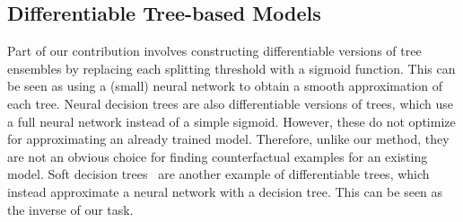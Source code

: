 \subsection{Differentiable Tree-based Models}
\label{section:focus-diff-trees}
Part of our contribution involves constructing differentiable versions of tree ensembles by replacing each splitting threshold with a sigmoid function. 
This can be seen as using a (small) neural network to obtain a smooth approximation of each tree. 
Neural decision trees \citep{balestriero_neural_2017, yang_deep_2018} are also differentiable versions of trees, which use a full neural network instead of a simple sigmoid. 
However, these do not optimize for approximating an already trained model. Therefore, unlike our method, they are not an obvious choice for finding counterfactual examples for an existing model. 
Soft decision trees~\citep{hinton_distilling_2014} are another example of differentiable trees, which instead approximate a neural network with a decision tree. 
This can be seen as the inverse of our task. 

